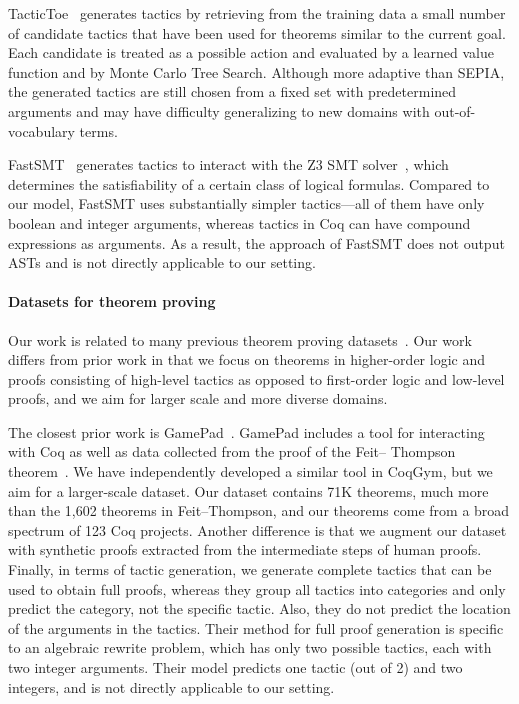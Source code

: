\documentclass{article}
\newcommand{\smallsec}[1]{\vspace{-3mm} \paragraph{#1}}
\newcommand{\datasetname}{CoqGym}
\newcommand{\numberofprojects}{123 }
\begin{document}
TacticToe~\citep{gauthier2018learning} generates tactics by retrieving from the training data a small number of candidate tactics that have been used for theorems similar to the current goal. Each candidate is treated as a possible action and evaluated by a learned value function and by Monte Carlo Tree Search. Although more adaptive than SEPIA, the generated tactics are still chosen from a fixed set with predetermined arguments and may have difficulty generalizing to new domains with out-of-vocabulary terms.  

FastSMT~\citep{balunovic2018learning} generates tactics to interact
with the Z3 SMT solver~\cite{de2008z3}, which determines the satisfiability of a certain class of logical formulas. 
Compared to our model, FastSMT uses substantially simpler tactics---all of them have only boolean and integer arguments, whereas tactics in Coq can have compound expressions as arguments. As a result, the approach of FastSMT does not output ASTs and is not directly applicable to our setting. 




\smallsec{Datasets for theorem proving}
Our work is related to many previous theorem proving datasets~\cite{sutcliffe2009tptp, bancerek2015mizar,gransden2015sepia,gauthier2018learning,huang2018gamepad}. Our work differs from prior work in that we focus on theorems in higher-order logic and proofs consisting of high-level tactics as opposed to first-order logic and low-level proofs, and we aim for larger scale and more diverse domains. 



The closest prior work is GamePad~\citep{huang2018gamepad}. GamePad includes a tool for interacting with Coq as well as data collected from the proof of the Feit– Thompson theorem~\citep{gonthier2013machine}. We have independently developed a similar tool in \datasetname, but we aim for a larger-scale dataset. 
Our dataset contains 71K theorems, much more than the 1,602 theorems in Feit--Thompson, and our theorems come from a broad spectrum of \numberofprojects Coq projects.
Another difference is that we augment our dataset with synthetic proofs extracted from the intermediate steps of human proofs. 
Finally, in terms of tactic generation, we generate complete tactics that can be used to obtain full proofs, whereas they group all tactics into categories and only predict the category, not the specific tactic.
Also, they do not predict the location of the arguments in the tactics. Their method for full proof generation is specific to an algebraic rewrite problem, which has only two possible tactics, each with two integer arguments. Their model predicts one tactic (out of 2) and two integers, and is not directly applicable to our setting. 
\end{document}
